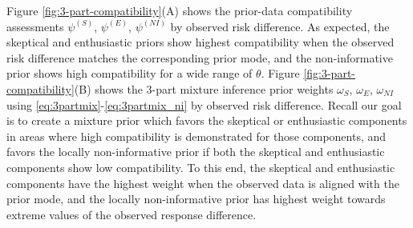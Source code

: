 \documentclass[useAMS,usenatbib,referee]{biom}
\begin{document}
Figure \ref{fig:3-part-compatibility}(A) shows the prior-data compatibility assessments $\psi^{(S)}$, $\psi^{(E)}$, $\psi^{(NI)}$ by observed risk difference.
%
As expected, the skeptical and enthusiastic priors show highest compatibility when the observed risk difference matches the corresponding prior mode, and the non-informative prior shows high compatibility for a wide range of $\theta$.
%
Figure \ref{fig:3-part-compatibility}(B) shows the 3-part mixture inference prior weights $\omega_S$, $\omega_{E}$, $\omega_{NI}$ using \eqref{eq:3partmix}-\eqref{eq:3partmix_ni} by observed risk difference.
%
Recall our goal is to create a mixture prior which favors the skeptical or enthusiastic components in areas where high compatibility is demonstrated for those components, and favors the locally non-informative prior if both the skeptical and enthusiastic components show low compatibility.
%
To this end, the skeptical and enthusiastic components have the highest weight when the observed data is aligned with the prior mode, and the locally non-informative prior has highest weight towards extreme values of the observed response difference.
\end{document}
